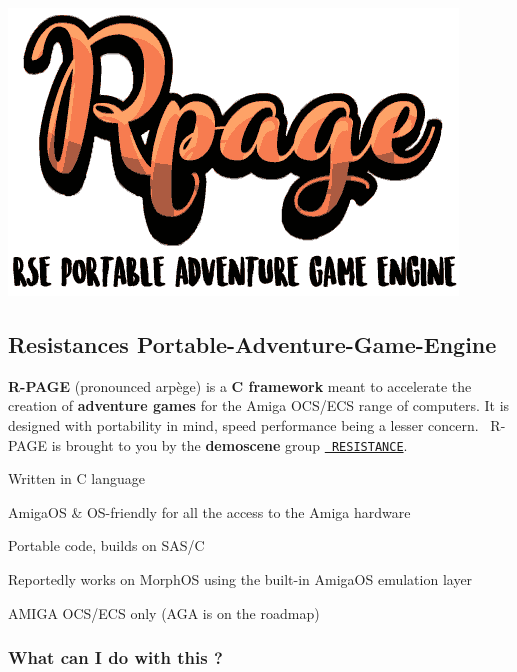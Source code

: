  
\begin{DoxyImageNoCaption}
  \mbox{\includegraphics[width=\textwidth,height=\textheight/2,keepaspectratio=true]{rpage_logo.png}}
\end{DoxyImageNoCaption}
  

\subsection*{Resistance\textquotesingle{}s Portable-\/\+Adventure-\/\+Game-\/\+Engine}

{\bfseries{R-\/\+P\+A\+GE}} (pronounced \textquotesingle{}arpège\textquotesingle{}) is a {\bfseries{C framework}} meant to accelerate the creation of {\bfseries{adventure games}} for the Amiga O\+C\+S/\+E\+CS range of computers. It is designed with portability in mind, speed performance being a lesser concern.~\newline
 R-\/\+P\+A\+GE is brought to you by the {\bfseries{demoscene}} group \href{https://resistance.no/}{\texttt{ R\+E\+S\+I\+S\+T\+A\+N\+CE}}.


\begin{DoxyItemize}
\item Written in C language
\item Amiga\+OS \& O\+S-\/friendly for all the access to the Amiga hardware
\item Portable code, builds on S\+A\+S/C
\item Reportedly works on Morph\+OS using the built-\/in Amiga\+OS emulation layer
\item A\+M\+I\+GA O\+C\+S/\+E\+CS only (A\+GA is on the roadmap)
\end{DoxyItemize}

\subsubsection*{What can I do with this ?}

